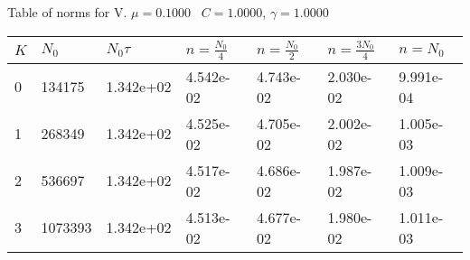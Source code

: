 \begin{center}
Table of norms for V. $\mu = 0.1000$ \, $C = 1.0000$, $\gamma = 1.0000$
  
\begin{tabular}{|p{0.8in}|p{0.8in}|p{0.8in}|p{0.8in}|p{0.8in}|p{0.8in}|p{0.8in}|} \hline
$K$ &$N_0$ &$N_0 \tau$ &$n = \frac{N_0}{4}$ &$n = \frac{N_0}{2}$ &$n = \frac{3N_0}{4}$ &$n = N_0$ \\ \hline 
0 &134175 &1.342e+02 &4.542e-02 &4.743e-02 &2.030e-02 &9.991e-04 \\ \hline 
1 &268349 &1.342e+02 &4.525e-02 &4.705e-02 &2.002e-02 &1.005e-03 \\ \hline 
2 &536697 &1.342e+02 &4.517e-02 &4.686e-02 &1.987e-02 &1.009e-03 \\ \hline 
3 &1073393 &1.342e+02 &4.513e-02 &4.677e-02 &1.980e-02 &1.011e-03 \\ \hline 

\end{tabular}\\[20pt]
\end{center}
